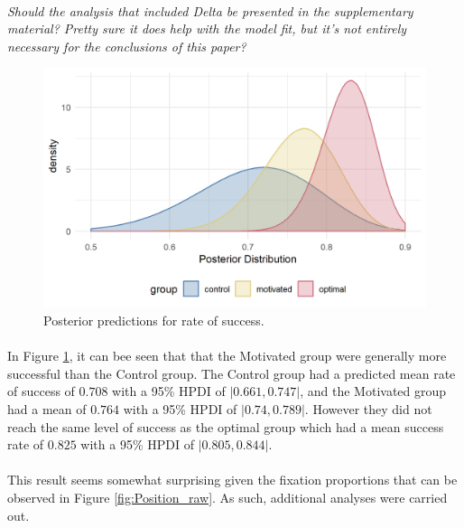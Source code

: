 \documentclass[12pt]{article}
\begin{document}
\paragraph{} \textit{Should the analysis that included Delta be presented in the supplementary material? Pretty sure it does help with the model fit, but it's not entirely necessary for the conclusions of this paper?}

\begin{figure}[ht!]
	\includegraphics[scale=1]{../Figures/Model_stan_rawacc.png}
	\centering
	\captionsetup{justification=centering}
	\caption{Posterior predictions for rate of success.}
	\label{fig:Model_raw_acc}
\end{figure}

\paragraph{} In Figure \ref{fig:Model_raw_acc}, it can bee seen that that the Motivated group were generally more successful than the Control group. The Control group had a predicted mean rate of success of $0.708$ with a 95\% HPDI of $|0.661, 0.747|$, and the Motivated group had a mean of $0.764$ with a 95\% HPDI of $|0.74, 0.789|$. However they did not reach the same level of success as the optimal group which had a mean success rate of $0.825$ with a 95\% HPDI of $|0.805, 0.844|$. 

\paragraph{} This result seems somewhat surprising given the fixation proportions that can be observed in Figure \ref{fig:Position_raw}. As such, additional analyses were carried out.
\end{document}
